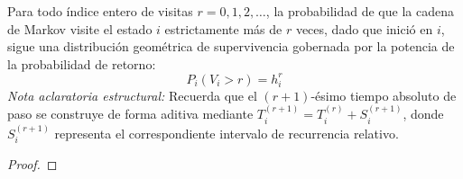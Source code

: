 \begin{lema}
    Para todo índice entero de visitas $r = 0, 1, 2, \dots$, la probabilidad de que la cadena de Markov visite el estado $i$ estrictamente más de $r$ veces, dado que inició en $i$, sigue una distribución geométrica de supervivencia gobernada por la potencia de la probabilidad de retorno:
    \[
    P_i(V_i > r) = h_i^r
    \]
    \textit{Nota aclaratoria estructural:} Recuerda que el $(r+1)$-ésimo tiempo absoluto de paso se construye de forma aditiva mediante $T_i^{(r+1)} = T_i^{(r)} + S_i^{(r+1)}$, donde $S_i^{(r+1)}$ representa el correspondiente intervalo de recurrencia relativo.

\begin{proof}
\end{proof}
\end{lema}

